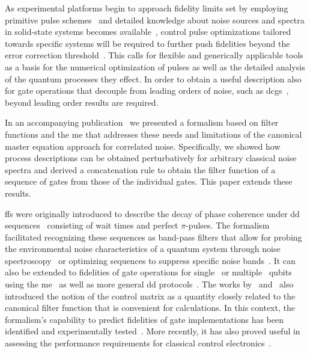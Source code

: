 As experimental platforms begin to approach fidelity limits set by employing primitive pulse schemes~\cite{Veldhorst2014,Debnath2016,Yoneda2018} and detailed knowledge about noise sources and spectra in solid-state systems becomes available~\cite{Dial2013,Quintana2017,Malinowski2017}, control pulse optimizations tailored towards specific systems will be required to further push fidelities beyond the error correction threshold~\cite{Barends2014,Blume-Kohout2017}.
This calls for flexible and generically applicable tools as a basis for the numerical optimization of pulses as well as the detailed analysis of the quantum processes they effect.
In order to obtain a useful description also for gate operations that decouple from leading orders of noise, such as \glspl{dcg}~\cite{Khodjasteh2009}, beyond leading order results are required.

In an accompanying publication~\cite{Cerfontaine2021} we presented a formalism based on filter functions and the \gls{me} that addresses these needs and limitations of the canonical master equation approach for correlated noise.
Specifically, we showed how process descriptions can be obtained perturbatively for arbitrary classical noise spectra and derived a concatenation rule to obtain the filter function of a sequence of gates from those of the individual gates.
This paper extends these results.

\Glspl{ff} were originally introduced to describe the decay of phase coherence under \gls{dd} sequences~\cite{Kofman2001,Martinis2003,Uhrig2006,Cywinski2008} consisting of wait times and perfect $\pi$-pulses.
The formalism facilitated recognizing these sequences as band-pass filters that allow for probing the environmental noise characteristics of a quantum system through noise spectroscopy~\cite{Alvarez2011,Bylander2011,Paz-Silva2017,Malinowski2017} or optimizing sequences to suppress specific noise bands~\cite{Biercuk2009,Uys2009,Soare2014,Malinowski2017}.
It can also be extended to fidelities of gate operations for single~\cite{Green2012,Green2013} or multiple~\cite{Gungordu2018,Ball2020} qubits using the \gls{me}~\cite{Magnus1954,Blanes2009} as well as more general \gls{dd} protocols~\cite{Paz-Silva2014}.
The works by~\citeauthor{Green2013} and~\citeauthor{Clausen2010} also introduced the notion of the control matrix as a quantity closely related to the canonical filter function that is convenient for calculations.
In this context, the formalism's capability to predict fidelities of gate implementations has been identified and experimentally tested~\cite{Green2013,Kabytayev2014,Soare2014,Ball2016}.
More recently, it has also proved useful in assessing the performance requirements for classical control electronics~\cite{VanDijk2019}.

